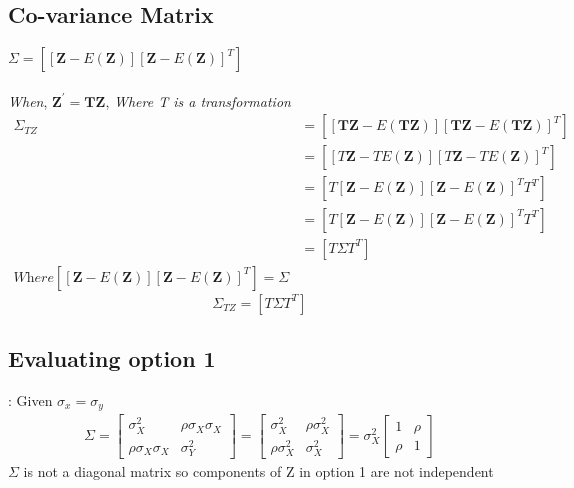 \documentclass[journal,12pt,twocolumn]{IEEEtran}
\begin{document}
\subsection{Co-variance Matrix}
    $\Sigma = [[\mathbf{Z} - E(\mathbf{Z})][\mathbf{Z} - E(\mathbf{Z})]^T]$\\
    \\\textit{When}, \hspace{5pt} $\mathbf{Z^{'} = TZ}$, \hspace{5pt} \textit{Where T is a transformation}\\
\begin{align*}
    \Sigma_{TZ} &= [[\mathbf{TZ} - E(\mathbf{TZ})][\mathbf{TZ} - E(\mathbf{TZ})]^T]\\
    &= [[T\mathbf{Z} - T E(\mathbf{Z})][T\mathbf{Z} - TE(\mathbf{Z})]^T]\\
    &= [T[\mathbf{Z} - E(\mathbf{Z})][\mathbf{Z} - E(\mathbf{Z})]^T T^T]\\
    &= [T[\mathbf{Z} - E(\mathbf{Z})][\mathbf{Z} - E(\mathbf{Z})]^T T^T]\\
    &=  [T \Sigma T^T]\\
    \textit{Where} [[\mathbf{Z} - E(\mathbf{Z})][\mathbf{Z} - E(\mathbf{Z})]^T] = \Sigma
\end{align*}
\begin{equation}
    \Sigma_{TZ} = [T \Sigma T^T]
\end{equation}

\subsection{Evaluating option 1}:
Given $\sigma_x = \sigma_y$
\begin{align*}
    \Sigma = \begin{bmatrix}
    \sigma_{X}^2              &  \rho \sigma_{X} \sigma_{X} \\
    \rho \sigma_{X} \sigma_{X}  &   \sigma_{Y}^2 
\end{bmatrix} = 
    \begin{bmatrix}
    \sigma_{X}^2          &  \rho \sigma_{X}^2 \\
    \rho \sigma_{X}^2      &   \sigma_{X}^2 
\end{bmatrix} = \sigma_{X}^2 
    \begin{bmatrix}
    1          &  \rho \\
    \rho       &   1
\end{bmatrix}
\end{align*}
$\Sigma$ is not a diagonal matrix so components of Z in option 1 are not independent
\end{document}
